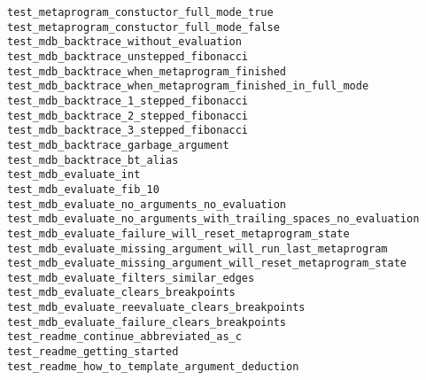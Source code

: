 \begin{description}
    \item[\texttt{test\_metaprogram\_constuctor\_full\_mode\_true}]
    \item[\texttt{test\_metaprogram\_constuctor\_full\_mode\_false}]
    \item[\texttt{test\_mdb\_backtrace\_without\_evaluation}]
    \item[\texttt{test\_mdb\_backtrace\_unstepped\_fibonacci}]
    \item[\texttt{test\_mdb\_backtrace\_when\_metaprogram\_finished}]
    \item[\texttt{test\_mdb\_backtrace\_when\_metaprogram\_finished\_in\_full\_mode}]
    \item[\texttt{test\_mdb\_backtrace\_1\_stepped\_fibonacci}]
    \item[\texttt{test\_mdb\_backtrace\_2\_stepped\_fibonacci}]
    \item[\texttt{test\_mdb\_backtrace\_3\_stepped\_fibonacci}]
    \item[\texttt{test\_mdb\_backtrace\_garbage\_argument}]
    \item[\texttt{test\_mdb\_backtrace\_bt\_alias}]
    \item[\texttt{test\_mdb\_evaluate\_int}]
    \item[\texttt{test\_mdb\_evaluate\_fib\_10}]
    \item[\texttt{test\_mdb\_evaluate\_no\_arguments\_no\_evaluation}]
    \item[\texttt{test\_mdb\_evaluate\_no\_arguments\_with\_trailing\_spaces\_no\_evaluation}]
    \item[\texttt{test\_mdb\_evaluate\_failure\_will\_reset\_metaprogram\_state}]
    \item[\texttt{test\_mdb\_evaluate\_missing\_argument\_will\_run\_last\_metaprogram}]
    \item[\texttt{test\_mdb\_evaluate\_missing\_argument\_will\_reset\_metaprogram\_state}]
    \item[\texttt{test\_mdb\_evaluate\_filters\_similar\_edges}]
    \item[\texttt{test\_mdb\_evaluate\_clears\_breakpoints}]
    \item[\texttt{test\_mdb\_evaluate\_reevaluate\_clears\_breakpoints}]
    \item[\texttt{test\_mdb\_evaluate\_failure\_clears\_breakpoints}]
    \item[\texttt{test\_readme\_continue\_abbreviated\_as\_c}]
    \item[\texttt{test\_readme\_getting\_started}]
    \item[\texttt{test\_readme\_how\_to\_template\_argument\_deduction}]
\end{description}

